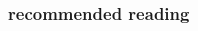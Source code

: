 \documentclass{beamer}
\begin{document}
\begin{frame}
  
  \frametitle{\textbf { recommended reading}}


  \begin{columns}

    \begin{column}{0.5\textwidth}
       \\

\end{column}
\end{columns}
\end{frame}
\end{document}
